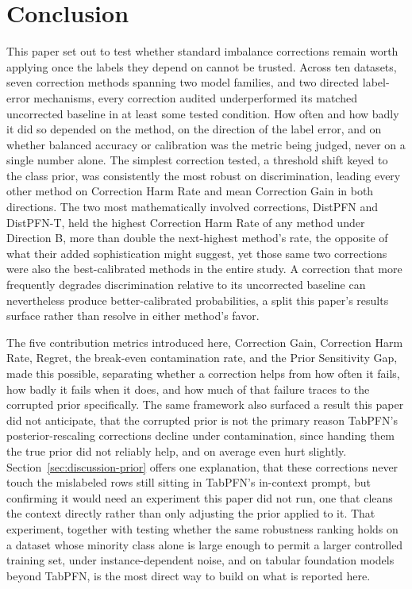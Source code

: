\section{Conclusion}
\label{sec:conclusion}

This paper set out to test whether standard imbalance corrections
remain worth applying once the labels they depend on cannot be
trusted. Across ten datasets, seven correction methods spanning two
model families, and two directed label-error mechanisms, every
correction audited underperformed its matched uncorrected baseline in
at least some tested condition. How often and how badly it did so
depended on the method, on the direction of the label error, and on
whether balanced accuracy or calibration was the metric being judged,
never on a single number alone.
The simplest correction tested, a threshold shift keyed to the class
prior, was consistently the most robust on discrimination, leading
every other method on Correction Harm Rate and mean Correction Gain in
both directions. The two most mathematically involved corrections,
DistPFN and DistPFN-T, held the highest Correction Harm Rate of any
method under Direction B, more than double the next-highest method's
rate, the opposite of what their added sophistication might suggest,
yet those same two corrections were also the best-calibrated
methods in the entire study. A correction that more frequently degrades
discrimination relative to its uncorrected baseline can nevertheless
produce better-calibrated probabilities, a split this paper's results
surface rather than resolve in either method's favor.

The five contribution metrics introduced here, Correction Gain,
Correction Harm Rate, Regret, the break-even contamination rate, and
the Prior Sensitivity Gap, made this possible, separating whether a
correction helps from how often it fails, how badly it fails when it
does, and how much of that failure traces to the corrupted prior
specifically. The same framework also
surfaced a result this paper did not anticipate, that the corrupted
prior is not the primary reason TabPFN's posterior-rescaling
corrections decline under contamination, since handing them the true
prior did not reliably help, and on average even hurt slightly.
Section~\ref{sec:discussion-prior} offers one explanation, that these
corrections never touch the mislabeled rows still sitting in TabPFN's
in-context prompt, but confirming it would need an experiment this
paper did not run, one that cleans the context directly rather than
only adjusting the prior applied to it. That experiment, together with
testing whether the same robustness ranking holds on a dataset whose
minority class alone is large enough to permit a larger controlled
training set, under instance-dependent noise, and on tabular
foundation models beyond TabPFN, is the most direct way to build on
what is reported here.
